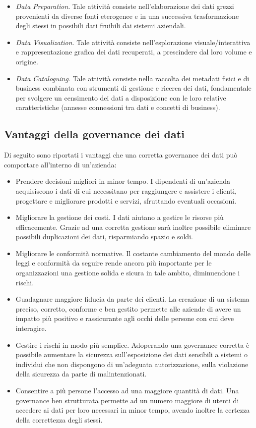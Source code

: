 \begin{itemize}
    \item \textit{Data Preparation}. Tale attività consiste nell'elaborazione dei dati grezzi provenienti da diverse fonti eterogenee e in una successiva trasformazione degli stessi in possibili dati fruibili dai sistemi aziendali.
    \item \textit{Data Visualization}. Tale attività consiste nell'esplorazione visuale/interattiva e rappresentazione grafica dei dati recuperati, a prescindere dal loro volume e origine.
    \item \textit{Data Cataloguing}. Tale attività consiste nella raccolta dei metadati fisici e di business combinata con strumenti di gestione e ricerca dei dati, fondamentale per svolgere un censimento dei dati a disposizione con le loro relative caratteristiche (annesse connessioni tra dati e concetti di business).
\end{itemize}

\subsection{Vantaggi della governance dei dati}

Di seguito sono riportati i vantaggi che una corretta governance dei dati può comportare all'interno di un'azienda:\cite{google_data_governance}
\begin{itemize}
    \item Prendere decisioni migliori in minor tempo. I dipendenti di un'azienda acquisiscono i dati di cui necessitano per raggiungere e assistere i clienti, progettare e migliorare prodotti e servizi, sfruttando eventuali occasioni.
    \item Migliorare la gestione dei costi. I dati aiutano a gestire le risorse più efficacemente. Grazie ad una corretta gestione sarà inoltre possibile eliminare possibili duplicazioni dei dati, risparmiando spazio e soldi.
    \item Migliorare le conformità normative. Il costante cambiamento del mondo delle leggi e conformità da seguire rende ancora più importante per le organizzazioni una gestione solida e sicura in tale ambito, diminuendone i rischi.
    \item Guadagnare maggiore fiducia da parte dei clienti. La creazione di un sistema preciso, corretto, conforme e ben gestito permette alle aziende di avere un impatto più positivo e rassicurante agli occhi delle persone con cui deve interagire.
    \item Gestire i rischi in modo più semplice. Adoperando una governance corretta è possibile aumentare la sicurezza sull'esposizione dei dati sensibili a sistemi o individui che non dispongono di un'adeguata autorizzazione, sulla violazione della sicurezza da parte di malintenzionati.
    \item Consentire a più persone l'accesso ad una maggiore quantità di dati. Una governance ben strutturata permette ad un numero maggiore di utenti di accedere ai dati per loro necessari in minor tempo, avendo inoltre la certezza della correttezza degli stessi.
\end{itemize}

